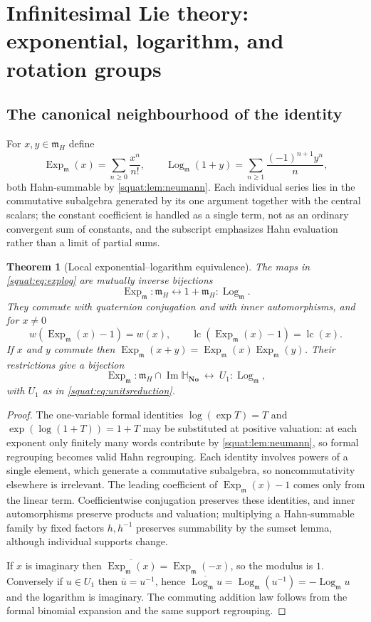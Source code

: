 \documentclass[11pt,letterpaper]{article}
\numberwithin{equation}{section}
\newtheorem{theorem}{Theorem}[section]
\theoremstyle{definition}
\theoremstyle{remark}
\newcommand{\No}{\mathbf{No}}
\newcommand{\SQ}{\mathbb H_{\No}}
\newcommand{\mm}{\mathfrak m}
\newcommand{\Ima}{\operatorname{Im}}
\newcommand{\lc}{\operatorname{lc}}
\newcommand{\Exp}{\operatorname{Exp}}
\newcommand{\Log}{\operatorname{Log}}
\newcommand{\Expm}{\Exp_{\mm}}
\newcommand{\Logm}{\Log_{\mm}}
\begin{document}
\section{Infinitesimal Lie theory: exponential, logarithm, and rotation groups}\label{squat:sec:explog}

\subsection{The canonical neighbourhood of the identity}\label{squat:sub:explog}
For $x,y\in\mm_H$ define
\begin{equation}\label{squat:eq:explog}
 \Expm(x)=\sum_{n\ge0}\frac{x^n}{n!},\qquad
 \Logm(1+y)=\sum_{n\ge1}\frac{(-1)^{n+1}y^n}{n},
\end{equation}
both Hahn-summable by \cref{squat:lem:neumann}. Each individual series lies in the
commutative subalgebra generated by its one argument together with the central scalars;
the constant coefficient is handled as a single term, not as an ordinary convergent sum of
constants, and the subscript emphasizes Hahn evaluation rather than a limit of partial
sums.

\begin{theorem}[Local exponential--logarithm equivalence]\label{squat:thm:principal-log}
The maps in \cref{squat:eq:explog} are mutually inverse bijections
\[
 \Expm:\mm_H\longleftrightarrow1+\mm_H:\Logm .
\]
They commute with quaternion conjugation and with inner automorphisms, and for $x\ne0$
\[
 w(\Expm(x)-1)=w(x),\qquad \lc(\Expm(x)-1)=\lc(x).
\]
If $x$ and $y$ commute then $\Expm(x+y)=\Expm(x)\Expm(y)$. Their restrictions give a
bijection
\begin{equation}\label{squat:eq:logunits}
 \Expm:\mm_H\cap\Ima\SQ\ \longleftrightarrow\ U_1:\Logm ,
\end{equation}
with $U_1$ as in \cref{squat:eq:unitsreduction}.
\end{theorem}
\begin{proof}
The one-variable formal identities $\log(\exp T)=T$ and $\exp(\log(1+T))=1+T$ may be
substituted at positive valuation: at each exponent only finitely many words contribute by
\cref{squat:lem:neumann}, so formal regrouping becomes valid Hahn regrouping. Each
identity involves powers of a single element, which generate a commutative subalgebra, so
noncommutativity elsewhere is irrelevant. The leading coefficient of $\Expm(x)-1$ comes
only from the linear term. Coefficientwise conjugation preserves these identities, and
inner automorphisms preserve products and valuation; multiplying a Hahn-summable family by
fixed factors $h,h^{-1}$ preserves summability by the sumset lemma, although individual
supports change.

If $x$ is imaginary then $\overline{\Expm(x)}=\Expm(-x)$, so the modulus is $1$.
Conversely if $u\in U_1$ then $\bar u=u^{-1}$, hence
$\overline{\Logm u}=\Logm(u^{-1})=-\Logm u$ and the logarithm is imaginary. The commuting
addition law follows from the formal binomial expansion and the same support regrouping.
\end{proof}
\end{document}
